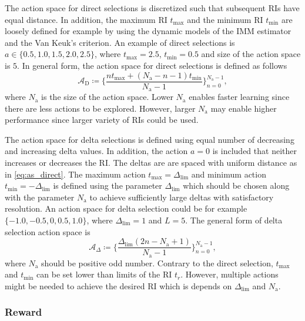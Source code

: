 \documentclass[english, 12pt, a4paper, elec, utf8, a-1b, online]{aaltothesis}
\newcommand{\As}{\mathcal{A}}
\newcommand{\tmax}{t_\text{max}}
\newcommand{\tmin}{t_\text{min}}
\newcommand{\deltalim}{\Delta_\text{lim}}
\newcommand{\Asdir}{\As_\text{D}}
\newcommand{\Asdelta}{\As_\Delta}
\newcommand{\nacts}{{N_\text{a}}}
\begin{document}
The action space for direct selections is discretized such that subsequent RIs have equal distance.
In addition, the maximum RI $\tmax$ and the minimum RI $\tmin$ are loosely defined for example by using the dynamic models of the IMM estimator and the Van Keuk's criterion.
An example of direct selections is $a \in \{0.5, 1.0, 1.5, 2.0, 2.5\}$, where $\tmax=2.5$, $\tmin=0.5$ and size of the action space is $5$.
In general form, the action space for direct selections is defined as follows
\begin{equation}\label{eq:as_direct}
    \Asdir \coloneqq \{ \frac{n \tmax + (\nacts-n-1) \tmin}{\nacts-1} \}_{n=0}^{\nacts-1},    
\end{equation}
where $\nacts$ is the size of the action space.
Lower $\nacts$ enables faster learning since there are less actions to be explored.
However, larger $\nacts$ may enable higher performance since larger variety of RIs could be used.

The action space for delta selections is defined using equal number of decreasing and increasing delta values. 
In addition, the action $a=0$ is included that neither increases or decreases the RI.
The deltas are are spaced with uniform distance as in \eqref{eq:as_direct}.
The maximum action $\tmax=\deltalim$ and minimum action $\tmin=-\deltalim$ is defined using the parameter $\deltalim$ which should be chosen along with the parameter $\nacts$ to achieve sufficiently large deltas with satisfactory resolution.
An action space for delta selection could be for example $\{ -1.0, -0.5, 0, 0.5, 1.0 \}$, where $\deltalim=1$ and $L=5$.
The general form of delta selection action space is
\begin{equation}\label{eq:as_delta}
    \Asdelta \coloneqq \{ \frac{\deltalim \left( 2 n - \nacts + 1 \right)}{\nacts-1} \}_{n=0}^{\nacts-1},
\end{equation}
where $\nacts$ should be positive odd number.
Contrary to the direct selection, $\tmax$ and $\tmin$ can be set lower than limits of the RI $t_r$.
However, multiple actions might be needed to achieve the desired RI which is depends on $\deltalim$ and $\nacts$.

\subsubsection{Reward} \label{sec:rewards}

\newcommand{\ploss}{P_\text{loss}}
\newcommand{\ri}{t_r}
\newcommand{\pref}{P_\text{ref}}
\newcommand{\lref}{L_\text{ref}}
\end{document}

